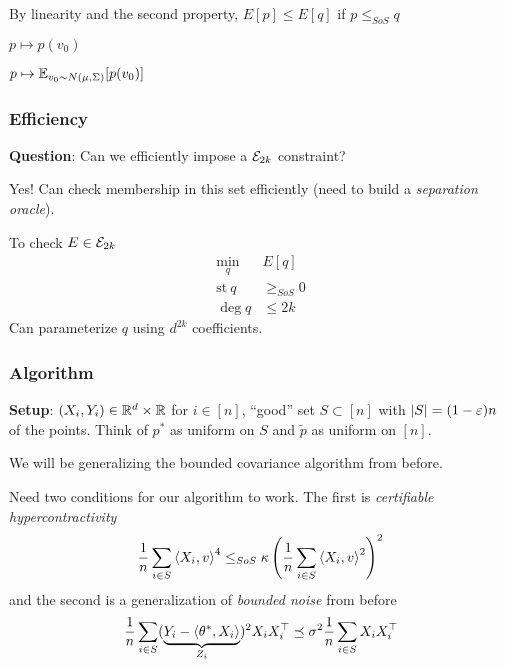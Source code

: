 \begin{remark}
  By linearity and the second property,
  $E[p] \leq E[q]$ if $p \leq_{SoS} q$
\end{remark}

\begin{example}
  $p \mapsto p(v_0)$

  $p \mapsto \mathbb{E}_{v_0 \sim N(\mu, \Sigma)}[p(v_0)]$
\end{example}

\subsubsection{Efficiency}

\textbf{Question}: Can we efficiently impose a $\mathcal{E}_{2k}$ constraint?

Yes! Can check membership in this set efficiently
(need to build a \emph{separation oracle}).

To check $E \in \mathcal{E}_{2k}$
\begin{align}
  \min_q~& E[q] \\
  \text{st}~q &\geq_{SoS} 0\\
  \deg q &\leq 2k
\end{align}
Can parameterize $q$ using $d^{2k}$ coefficients.

\subsubsection{Algorithm}%

\textbf{Setup}: $(X_i, Y_i) \in \mathbb{R}^d \times \mathbb{R}$ for $i \in [n]$,
``good'' set $S \subset [n]$ with $\lvert S \rvert = (1 - \varepsilon) n$ of the points.
Think of $p^*$ as uniform on $S$ and $\tilde{p}$ as uniform on $[n]$.

We will be generalizing the bounded covariance algorithm from before.

Need two conditions for our algorithm to work. The first is
\emph{certifiable hypercontractivity}
\begin{align}
  \frac{1}{n}  \sum_{i \in S} \braket{X_i, v}^4 \leq_{SoS} \kappa \left(
    \frac{1}{n} \sum_{i \in S} \braket{X_i, v}^2
  \right)^2
\end{align}
and the second is a generalization of \emph{bounded noise} from before
\begin{align}
  \frac{1}{n} \sum_{i \in S} 
  (\underbrace{Y_i - \braket{\theta^*, X_i}}_{Z_i})^2 X_i X_i^\top
    \preceq \sigma^2 \frac{1}{n} \sum_{i \in S} X_i X_i^\top
\end{align}




